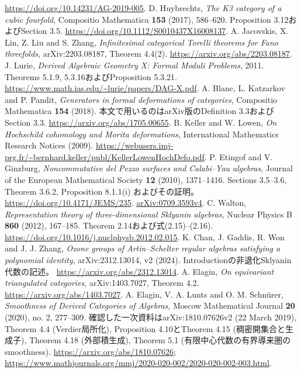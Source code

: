 \url{https://doi.org/10.14231/AG-2019-005}.
D. Huybrechts, \emph{The K3 category of a cubic fourfold},
Compositio Mathematica \textbf{153} (2017), 586--620.
Proposition 3.12およびSection 3.5.
\url{https://doi.org/10.1112/S0010437X16008137}.
A. Jacovskis, X. Lin, Z. Liu and S. Zhang,
\emph{Infinitesimal categorical Torelli theorems for Fano threefolds},
arXiv:2203.08187, Theorem 4.4(2).
\url{https://arxiv.org/abs/2203.08187}.
J. Lurie, \emph{Derived Algebraic Geometry X: Formal Moduli Problems},
2011. Theorems 5.1.9, 5.3.16およびProposition 5.3.21.
\url{https://www.math.ias.edu/~lurie/papers/DAG-X.pdf}.
A. Blanc, L. Katzarkov and P. Pandit,
\emph{Generators in formal deformations of categories},
Compositio Mathematica \textbf{154} (2018).
本文で用いるのはarXiv版のDefinition 3.3およびSection 3.3.
\url{https://arxiv.org/abs/1705.00655}.
B. Keller and W. Lowen,
\emph{On Hochschild cohomology and Morita deformations},
International Mathematics Research Notices (2009).
\url{https://webusers.imj-prg.fr/~bernhard.keller/publ/KellerLowenHochDefo.pdf}.
P. Etingof and V. Ginzburg,
\emph{Noncommutative del Pezzo surfaces and Calabi--Yau algebras},
Journal of the European Mathematical Society \textbf{12} (2010), 1371--1416.
Sections 3.5--3.6, Theorem 3.6.2, Proposition 8.1.1(i) およびその証明。
\url{https://doi.org/10.4171/JEMS/235}.
\href{https://arxiv.org/abs/0709.3593v4}{arXiv:0709.3593v4}.
C. Walton, \emph{Representation theory of three-dimensional Sklyanin algebras},
Nuclear Physics B \textbf{860} (2012), 167--185.
Theorem 2.14および式(2.15)--(2.16).
\url{https://doi.org/10.1016/j.nuclphysb.2012.02.015}.
K. Chan, J. Gaddis, R. Won and J. J. Zhang,
\emph{Ozone groups of Artin--Schelter regular algebras satisfying a polynomial identity},
arXiv:2312.13014, v2 (2024). Introductionの非退化Sklyanin代数の記述。
\url{https://arxiv.org/abs/2312.13014}.
A. Elagin, \emph{On equivariant triangulated categories},
arXiv:1403.7027, Theorem 4.2.
\url{https://arxiv.org/abs/1403.7027}.
A. Elagin, V. A. Lunts and O. M. Schn\"urer,
\emph{Smoothness of Derived Categories of Algebras},
Moscow Mathematical Journal \textbf{20} (2020), no. 2, 277--309.
確認した一次資料はarXiv:1810.07626v2 (22 March 2019),
Theorem 4.4 (Verdier局所化), Proposition 4.10とTheorem 4.15 (稠密開集合と生成子),
Theorem 4.18 (外部積生成), Theorem 5.1 (有限中心代数の有界導来圏のsmoothness).
\url{https://arxiv.org/abs/1810.07626};
\url{https://www.mathjournals.org/mmj/2020-020-002/2020-020-002-003.html}.

